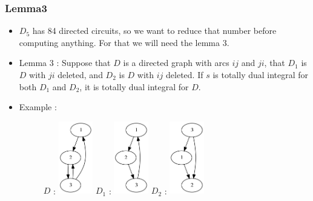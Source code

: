 \documentclass{beamer}
\begin{document}
\begin{frame}
	\frametitle{Lemma3}
	\begin{itemize}
		\item $D_5$ has 84 directed circuits, so we want to reduce that number before computing anything. For that we will need the lemma 3.
		\item Lemma 3 : Suppose that $D$ is a directed graph with arcs $ij$ and $ji$, that $D_1$ is $D$ with $ji$ deleted, and $D_2$ is $D$ with $ij$ deleted. If $s$ is totally dual integral for both $D_1$ and $D_2$, it is totally dual integral for $D$.
		\item
		Example :
		\begin{figure}
			\centering
			$D$ : \includegraphics[width=1.5cm]{images/example1.png}
			$D_1$ : \includegraphics[width=1.5cm]{images/D1.png} 
			$D_2$ : \includegraphics[width=1.5cm]{images/D2.png}
		\end{figure}
	\end{itemize}
\end{frame}
\end{document}

